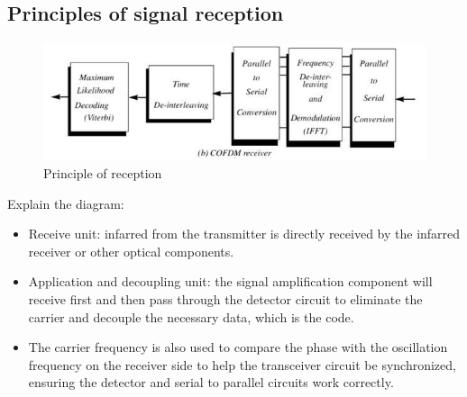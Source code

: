 \documentclass[a4paper]{report}
\begin{document}
    \subsection{Principles of signal reception}
        \begin{figure}[ht]
            \centering
            \includegraphics[width=\linewidth]{receiver.jpg}
            \caption{\label{fig:boat}Principle of reception}
        \end{figure}
        \par Explain the diagram:
        \begin{itemize}
            \item Receive unit: infarred from the transmitter is directly received by the infarred 
            receiver or other optical components.
            \item Application and decoupling unit: the signal amplification component will receive 
            first and then pass through the detector circuit to eliminate the carrier and decouple 
            the necessary data, which is the code.
            \item The carrier frequency is also used to compare the phase with the oscillation frequency 
            on the receiver side to help the transceiver circuit be synchronized, ensuring the detector 
            and serial to parallel circuits work correctly.
        \end{itemize}
\end{document}
